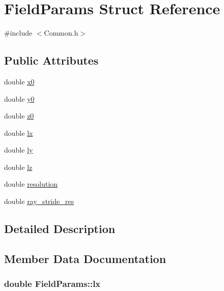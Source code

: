 \hypertarget{struct_field_params}{}\section{Field\+Params Struct Reference}
\label{struct_field_params}


{\ttfamily \#include $<$Common.\+h$>$}

\subsection*{Public Attributes}
\begin{DoxyCompactItemize}
\item 
double \hyperlink{struct_field_params_ae702824fca4d3a4b4bbf4ac90084e3a7}{x0}
\item 
double \hyperlink{struct_field_params_ae9d400dadcfaaff44706adae06664c83}{y0}
\item 
double \hyperlink{struct_field_params_a51178f64cc93a37d6d8f774228c24a0f}{z0}
\item 
double \hyperlink{struct_field_params_a9738077907a76512e49cb284ee3f1949}{lx}
\item 
double \hyperlink{struct_field_params_afb39ded77b5714992e9b2f8c5d735d30}{ly}
\item 
double \hyperlink{struct_field_params_ae7532b58aed59f5b47233e57b67acc1a}{lz}
\item 
double \hyperlink{struct_field_params_a520406c76b3abf392401626bc2161370}{resolution}
\item 
double \hyperlink{struct_field_params_ae6eabaa6e593c9dbac48b2f96bea80ec}{ray\+\_\+stride\+\_\+res}
\end{DoxyCompactItemize}


\subsection{Detailed Description}


\subsection{Member Data Documentation}
\subsubsection[{\texorpdfstring{lx}{lx}}]{\setlength{\rightskip}{0pt plus 5cm}double Field\+Params\+::lx}\hypertarget{struct_field_params_a9738077907a76512e49cb284ee3f1949}{}\label{struct_field_params_a9738077907a76512e49cb284ee3f1949}
